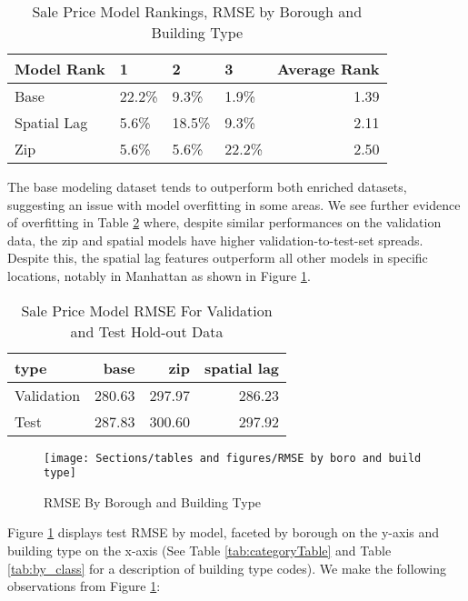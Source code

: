 \documentclass[12pt,]{article}
\begin{document}
\begin{table}

\caption{\label{tab:Sale Price Model Rank Distributions}\label{tab:SalePriceModelRank} Sale Price Model Rankings, RMSE by Borough and Building Type}
\centering
\begin{tabular}[t]{llllr}
\toprule
Model Rank & 1 & 2 & 3 & Average Rank\\
\midrule
Base & 22.2\% & 9.3\% & 1.9\% & 1.39\\
Spatial Lag & 5.6\% & 18.5\% & 9.3\% & 2.11\\
Zip & 5.6\% & 5.6\% & 22.2\% & 2.50\\
\bottomrule
\end{tabular}
\end{table}

The base modeling dataset tends to outperform both enriched datasets,
suggesting an issue with model overfitting in some areas. We see further
evidence of overfitting in Table \ref{tab:SalePriceEval} where, despite
similar performances on the validation data, the zip and spatial models
have higher validation-to-test-set spreads. Despite this, the spatial
lag features outperform all other models in specific locations, notably
in Manhattan as shown in Figure \ref{fig:RMSE by boro and build type}.

\begin{table}

\caption{\label{tab:Sale Price Evaluations}\label{tab:SalePriceEval} Sale Price Model RMSE For Validation and Test Hold-out Data}
\centering
\begin{tabular}[t]{lrrr}
\toprule
type & base & zip & spatial lag\\
\midrule
Validation & 280.63 & 297.97 & 286.23\\
Test & 287.83 & 300.60 & 297.92\\
\bottomrule
\end{tabular}
\end{table}

\begin{figure}[H]
\texttt{[image: Sections/tables and figures/RMSE by boro and build type]} \caption{RMSE By Borough and Building Type}\label{fig:RMSE by boro and build type}
\end{figure}

Figure \ref{fig:RMSE by boro and build type} displays test RMSE by
model, faceted by borough on the y-axis and building type on the x-axis
(See Table \ref{tab:categoryTable} and Table \ref{tab:by_class} for a
description of building type codes). We make the following observations
from Figure \ref{fig:RMSE by boro and build type}:
\end{document}
